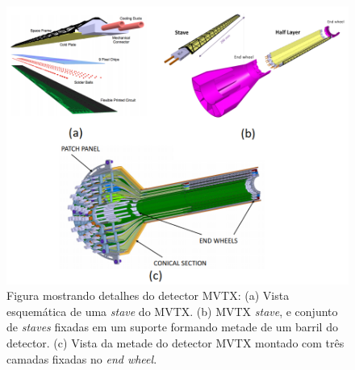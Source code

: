 \begin{figure} 
    \centering
    \includegraphics[width=16.0cm]{assets/mvtx_detail.JPG}
    \caption{Figura mostrando detalhes do detector MVTX: (a) Vista esquemática de uma \textit{stave} do MVTX. (b) MVTX \textit{stave}, e conjunto de \textit{staves} fixadas em um suporte formando metade de um barril do detector. (c) Vista da metade do detector MVTX montado com três camadas fixadas no \textit{end wheel}.}
    \label{mvtxdetail}
\end{figure}

\renewcommand{\cleardoublepage}{}
\renewcommand{\clearpage}{}